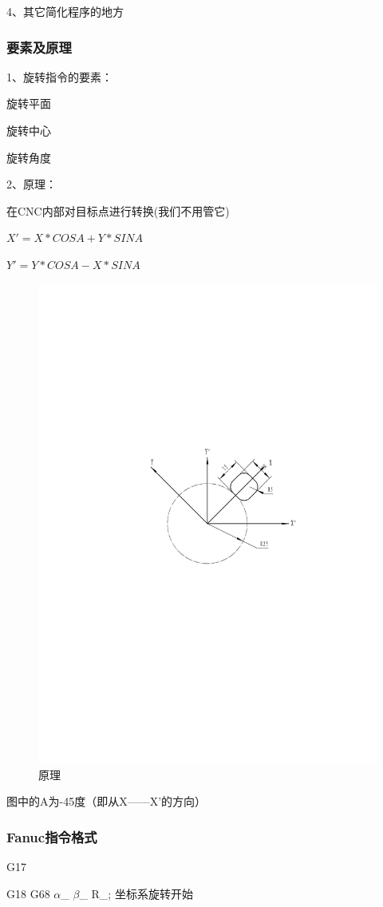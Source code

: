	4、其它简化程序的地方
	
\subsubsection{要素及原理}
	1、旋转指令的要素：
	
	旋转平面
	
	旋转中心
	
	旋转角度
	
	2、原理：
	
	在CNC内部对目标点进行转换(我们不用管它)
	
	$X'=X*COSA+Y*SINA$
	
	$Y'=Y*COSA-X*SINA$
	
	\begin{figure}[h]
		\centering
		\includegraphics[width=0.7\linewidth,trim=50 285 50  250,clip]{data/image/31-1}
		\caption{原理}
		\label{fig:31-1}
	\end{figure}
	
	图中的A为-45度（即从X------X’的方向）
	
	
\subsubsection{Fanuc指令格式}

G17

G18 G68 $\alpha$\_ $\beta$\_ R\_; 坐标系旋转开始

